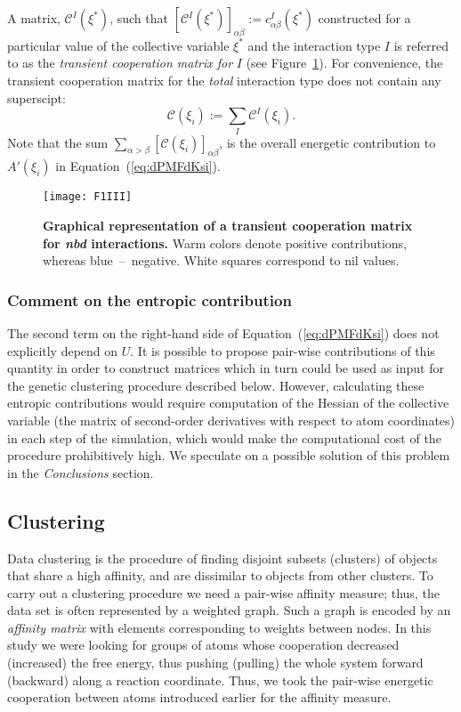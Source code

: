 \documentclass[a4paper,11pt,twoside]{book}%
\begin{document}
A matrix, $\mathcal{C}^{I}(\xi^*)$, such that $[\mathcal{C}^I(\xi^*)]_{\alpha\beta}:=c^I_{\alpha\beta}(\xi^*)$ constructed for a particular value of the collective variable $\xi^*$ and the interaction type $I$ is referred to as the \emph{transient cooperation matrix for} $I$ {\color{black}(see Figure~\ref{fig:numberedMatrix})}.
For convenience, the transient cooperation matrix for the \emph{total} interaction type does not contain any superscipt: $$\mathcal{C}(\xi_i):=\sum_I\mathcal{C}^I(\xi_i).$$
Note that the sum $\sum_{\alpha>\beta}[\mathcal{C}(\xi_i)]_{\alpha\beta}$, is the overall energetic contribution to $A'(\xi_i)$ in Equation~(\ref{eq:dPMFdKsi}).

\begin{figure}[h!]
\centering
\texttt{[image: F1III]}
\caption{
{\bf Graphical representation of a transient cooperation matrix for \emph{nbd} interactions.}
Warm colors denote positive contributions, whereas blue~--~negative.
White squares correspond to {\color{black}nil values}.
}
\label{fig:numberedMatrix}
\end{figure}

\subsubsection{Comment on the entropic contribution} 
The second term on the right-hand side of Equation~(\ref{eq:dPMFdKsi}) does not explicitly depend on $U$.
It is possible to propose pair-wise contributions of this quantity in order to construct matrices which in turn could be used as input for the genetic clustering procedure described below.
{\color{black}However, calculating these entropic contributions would require computation of the Hessian of the collective variable (the matrix of second-order derivatives with respect to atom coordinates) in each step of the simulation, which would make the computational cost of the procedure prohibitively high.}
{\color{black}We speculate on a possible solution of this problem in the \emph{Conclusions} section.}

\subsection{Clustering}
Data clustering is the procedure of finding disjoint subsets (clusters) of objects that share a high affinity, and are dissimilar to objects from other clusters.
To carry out a clustering procedure we need a pair-wise affinity measure; thus, the data set is often represented by a weighted graph.
Such {\color{black}a} graph is encoded by an \emph{affinity matrix} with elements corresponding to weights between nodes.
In this study we were looking for groups of atoms whose cooperation decreased (increased) the free energy, thus pushing (pulling) the whole system forward (backward) along a reaction coordinate.
Thus, we took the pair-wise energetic cooperation between atoms introduced earlier for the affinity measure. 
\end{document}
